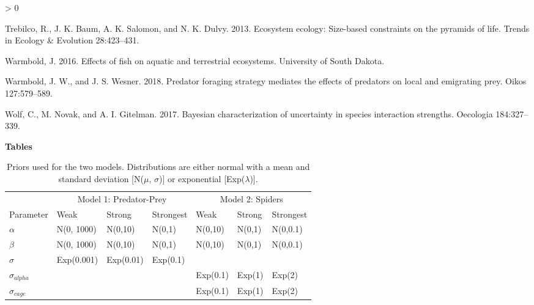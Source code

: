 \documentclass[
  12pt,
]{article}
\newlength{\cslhangindent}
\newenvironment{CSLReferences}[2] %
 {%
  \setlength{\parindent}{0pt}
  \ifodd #1 \everypar{\setlength{\hangindent}{\cslhangindent}}\ignorespaces\fi
  \ifnum #2 > 0
  \setlength{\parskip}{#2\baselineskip}
  \fi
 }%
 {}
\begin{document}
\begin{CSLReferences}{1}{0}
\leavevmode\hypertarget{ref-trebilco_ecosystem_2013}{}%
Trebilco, R., J. K. Baum, A. K. Salomon, and N. K. Dulvy. 2013.
Ecosystem ecology: Size-based constraints on the pyramids of life.
Trends in Ecology \& Evolution 28:423--431.

\leavevmode\hypertarget{ref-warmbold_effects_2016}{}%
Warmbold, J. 2016. Effects of fish on aquatic and terrestrial
ecosystems. University of South Dakota.

\leavevmode\hypertarget{ref-warmbold_predator_2018}{}%
Warmbold, J. W., and J. S. Wesner. 2018. Predator foraging strategy
mediates the effects of predators on local and emigrating prey. Oikos
127:579--589.

\leavevmode\hypertarget{ref-wolf_bayesian_2017}{}%
Wolf, C., M. Novak, and A. I. Gitelman. 2017. Bayesian characterization
of uncertainty in species interaction strengths. Oecologia 184:327--339.

\end{CSLReferences}

\newpage
\renewcommand{\arraystretch}{2}

\textbf{Tables}

\begin{table}[!h]

\caption{\label{tab:unnamed-chunk-1}Priors used for the two models. Distributions are either normal with a mean and standard deviation [N($\mu$, $\sigma$)] or exponential [Exp($\lambda$)].}
\centering
\begin{tabular}[t]{lllllll}
\toprule
\multicolumn{1}{c}{ } & \multicolumn{3}{c}{Model 1: Predator-Prey} & \multicolumn{3}{c}{Model 2: Spiders} \\
\cmidrule(l{3pt}r{3pt}){2-4} \cmidrule(l{3pt}r{3pt}){5-7}
Parameter & Weak & Strong & Strongest & Weak & Strong & Strongest\\
\midrule
$\alpha$ & N(0, 1000) & N(0,10) & N(0,1) & N(0,10) & N(0,1) & N(0,0.1)\\
$\beta$ & N(0, 1000) & N(0,10) & N(0,1) & N(0,10) & N(0,1) & N(0,0.1)\\
$\sigma$ & Exp(0.001) & Exp(0.01) & Exp(0.1) &  &  & \\
$\sigma_{alpha}$ &  &  &  & Exp(0.1) & Exp(1) & Exp(2)\\
$\sigma_{cage}$ &  &  &  & Exp(0.1) & Exp(1) & Exp(2)\\
\bottomrule
\end{tabular}
\end{table}

\newpage
\end{document}
